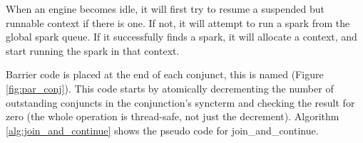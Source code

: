 When an engine becomes idle, it will first try
to resume a suspended but runnable context if there is one.
If not, it will attempt to run a spark from the global spark queue.
If it successfully finds a spark, it will allocate a context,
and start running the spark in that context.


Barrier code is placed at the end of each conjunct,
this is named  (Figure \ref{fig:par_conj}).
This code starts by atomically decrementing the number of outstanding
conjuncts in the conjunction's syncterm and checking the result for zero
(the whole operation is thread-safe, not just the decrement).
Algorithm \ref{alg:join_and_continue} shows the pseudo code for
join\_and\_continue.


%
%
%
%
